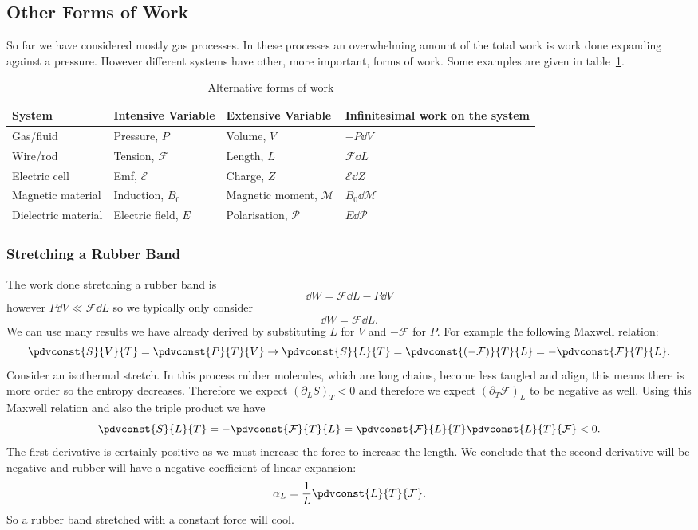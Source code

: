     \subsection{Other Forms of Work}
    So far we have considered mostly gas processes.
    In these processes an overwhelming amount of the total work is work done expanding against a pressure.
    However different systems have other, more important, forms of work.
    Some examples are given in table~\ref{tab:alternative forms of work}.
    \begin{table}
        \centering
        \begin{tabular}{llll}\hline
            System & Intensive Variable & Extensive Variable & Infinitesimal work on the system\\\hline
            Gas/fluid & Pressure, \(P\) & Volume, \(V\) & \(-P\dd{V}\)\\
            Wire/rod & Tension, \(\mathcal{F}\) & Length, \(L\) & \(\mathcal{F}\dd{L}\)\\
            Electric cell & Emf, \(\mathcal{E}\) & Charge, \(Z\) & \(\mathcal{E}\dd{Z}\)\\
            Magnetic material & Induction, \(B_0\) & Magnetic moment, \(\mathcal{M}\) & \(B_0\dd{\mathcal{M}}\)\\
            Dielectric material & Electric field, \(E\) & Polarisation, \(\mathcal{P}\) & \(E\dd{\mathcal{P}}\)\\\hline
        \end{tabular}
        \caption{Alternative forms of work}
        \label{tab:alternative forms of work}
    \end{table}

    \subsubsection{Stretching a Rubber Band}
    The work done stretching a rubber band is
    \[\dd{W} = \mathcal{F}\dd{L} - P\dd{V}\]
    however \(P\dd{V}\ll \mathcal{F}\dd{L}\) so we typically only consider
    \[\dd{W} = \mathcal{F}\dd{L}.\]
    We can use many results we have already derived by substituting \(L\) for \(V\) and \(-\mathcal{F}\) for \(P\).
    For example the following Maxwell relation:
    \[\pdvconst{S}{V}{T} = \pdvconst{P}{T}{V} \rightarrow \pdvconst{S}{L}{T} = \pdvconst{(-\mathcal{F})}{T}{L} = -\pdvconst{\mathcal{F}}{T}{L}.\]
    Consider an isothermal stretch.
    In this process rubber molecules, which are long chains, become less tangled and align, this means there is more order so the entropy decreases.
    Therefore we expect \((\partial_LS)_T < 0\) and therefore we expect \((\partial_T\mathcal{F})_L\) to be negative as well.
    Using this Maxwell relation and also the triple product we have
    \[\pdvconst{S}{L}{T} = -\pdvconst{\mathcal{F}}{T}{L} = \pdvconst{\mathcal{F}}{L}{T}\pdvconst{L}{T}{\mathcal{F}} < 0.\]
    The first derivative is certainly positive as we must increase the force to increase the length.
    We conclude that the second derivative will be negative and rubber will have a negative coefficient of linear expansion:
    \[\alpha_L = \frac{1}{L}\pdvconst{L}{T}{\mathcal{F}}.\]
    So a rubber band stretched with a constant force will cool.
    
